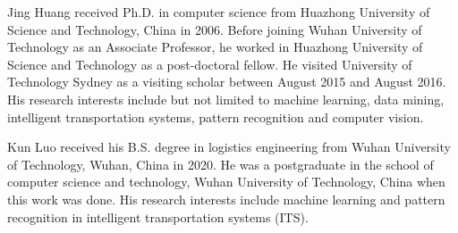 \documentclass[journal]{IEEEtran}
\begin{document}
\IEEEdisplaynontitleabstractindextext
\IEEEpeerreviewmaketitle












\begin{IEEEbiography}{Jing Huang} received Ph.D. in computer science from Huazhong University of Science and Technology, China in 2006. Before joining Wuhan University of Technology as an Associate Professor, he worked in Huazhong University of Science and Technology as a post-doctoral fellow. He visited University of Technology Sydney as a visiting scholar between August 2015 and August 2016. His research interests include but not limited to machine learning, data mining, intelligent transportation systems, pattern recognition and computer vision.
\end{IEEEbiography}

\begin{IEEEbiography}{Kun Luo} received his B.S. degree in logistics engineering from Wuhan University of Technology, Wuhan, China in 2020. He was a postgraduate in the school of computer science and technology, Wuhan University of Technology, China when this work was done. His research interests include machine learning and pattern recognition in intelligent transportation systems (ITS).
\end{IEEEbiography}
\end{document}
